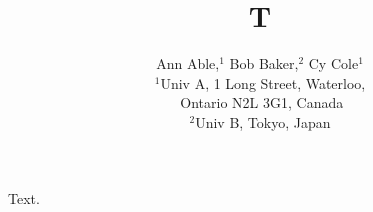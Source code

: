 \documentclass{mnras}
\begin{document}
\title{T}
\author[A. Able et al.]{Ann Able,$^{1}$ Bob Baker,$^{2}$ Cy Cole$^{1}$
\\
$^{1}$Univ A, 1 Long Street, Waterloo, \\
$^{\;}$Ontario N2L 3G1, Canada \\
$^{2}$Univ B, Tokyo, Japan
}
\maketitle
Text.
\end{document}
